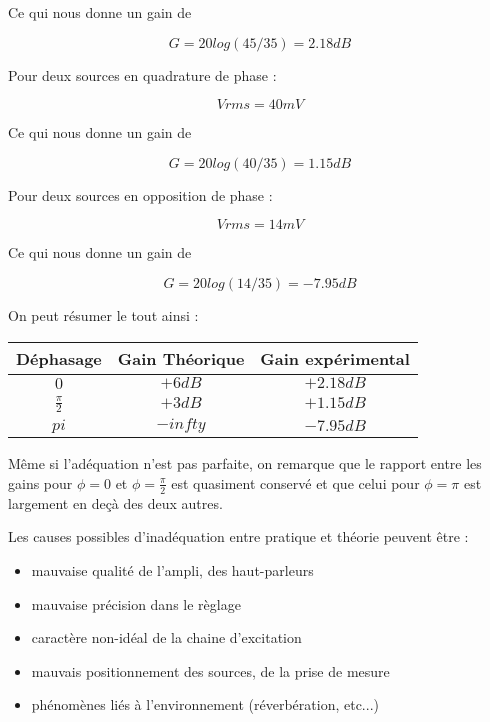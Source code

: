 \documentclass[a4paper]{report}
\begin{document}
Ce qui nous donne un gain de 

$$G = 20log(45/35) = 2.18dB$$

Pour deux sources en quadrature de phase :

$$Vrms = 40 mV$$

Ce qui nous donne un gain de 

$$G = 20log(40/35) = 1.15dB$$

Pour deux sources en opposition de phase :

$$Vrms = 14mV$$

Ce qui nous donne un gain de

$$G = 20log(14/35) = -7.95dB$$

On peut résumer le tout ainsi :

\begin{center}
\begin{tabular}{|c|c|c|}\hline
Déphasage     &     Gain Théorique    &  Gain expérimental   \\\hline
  $0$          &         $+6dB$         &       $+2.18dB$        \\
  $\frac{\pi}{2}$       &         $+3dB$         &       $+1.15dB$        \\
  $pi$         &         $-infty$       &       $-7.95dB$        \\\hline
\end{tabular}
\end{center}

Même si l'adéquation n'est pas parfaite, on remarque que le rapport entre les gains pour $\phi=0$ et $\phi=\frac{\pi}{2}$ est quasiment conservé et que celui pour $\phi=\pi$ est largement en deçà des deux autres.

Les causes possibles d'inadéquation entre pratique et théorie peuvent être :
%
\begin{itemize}

\item mauvaise qualité de l'ampli, des haut-parleurs

\item mauvaise précision dans le règlage

\item caractère non-idéal de la chaine d'excitation

\item mauvais positionnement des sources, de la prise de mesure

\item phénomènes liés à l'environnement (réverbération, etc...)

\end{itemize}
\end{document}
